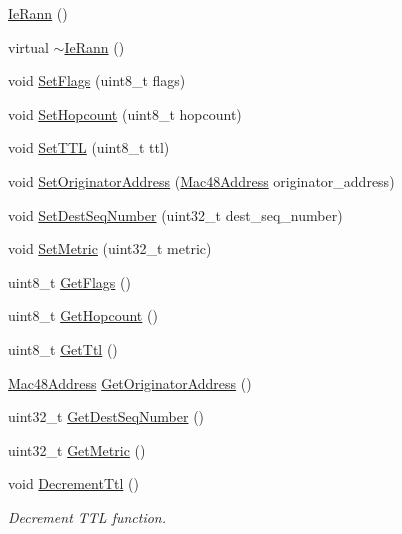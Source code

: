 \begin{DoxyCompactItemize}
\item 
\hyperlink{classns3_1_1dot11s_1_1IeRann_add4a22228ac76a3474c97adfbfef9bd2}{Ie\+Rann} ()
\item 
virtual \hyperlink{classns3_1_1dot11s_1_1IeRann_a70dc00da4bf971bf803baa72fd24ab66}{$\sim$\+Ie\+Rann} ()
\item 
void \hyperlink{classns3_1_1dot11s_1_1IeRann_af3b5bf4a57e30094361078a27d746831}{Set\+Flags} (uint8\+\_\+t flags)
\item 
void \hyperlink{classns3_1_1dot11s_1_1IeRann_aba1d81daa2025c8e12dbb7157bf91c74}{Set\+Hopcount} (uint8\+\_\+t hopcount)
\item 
void \hyperlink{classns3_1_1dot11s_1_1IeRann_a6574c88ee76ab7aac5d3818d1f242ac3}{Set\+T\+TL} (uint8\+\_\+t ttl)
\item 
void \hyperlink{classns3_1_1dot11s_1_1IeRann_acc6bd87dcd2b05d50db2e955ce880d25}{Set\+Originator\+Address} (\hyperlink{classns3_1_1Mac48Address}{Mac48\+Address} originator\+\_\+address)
\item 
void \hyperlink{classns3_1_1dot11s_1_1IeRann_ae4b2a333899cd5ffab78ba602cd96000}{Set\+Dest\+Seq\+Number} (uint32\+\_\+t dest\+\_\+seq\+\_\+number)
\item 
void \hyperlink{classns3_1_1dot11s_1_1IeRann_a069e5d99747574cb524f26fbf4f1eb67}{Set\+Metric} (uint32\+\_\+t metric)
\item 
uint8\+\_\+t \hyperlink{classns3_1_1dot11s_1_1IeRann_a1313537f2f89a35c652ee22fb7206b70}{Get\+Flags} ()
\item 
uint8\+\_\+t \hyperlink{classns3_1_1dot11s_1_1IeRann_ab0ff03e34f780dc4c44a1242be19338e}{Get\+Hopcount} ()
\item 
uint8\+\_\+t \hyperlink{classns3_1_1dot11s_1_1IeRann_a044cd9f053d04a6b40e811a1435c592b}{Get\+Ttl} ()
\item 
\hyperlink{classns3_1_1Mac48Address}{Mac48\+Address} \hyperlink{classns3_1_1dot11s_1_1IeRann_af5f2043ef007c9e5350f9ad61e49392d}{Get\+Originator\+Address} ()
\item 
uint32\+\_\+t \hyperlink{classns3_1_1dot11s_1_1IeRann_aa5a4c1ad34410624696aa4b349b8e277}{Get\+Dest\+Seq\+Number} ()
\item 
uint32\+\_\+t \hyperlink{classns3_1_1dot11s_1_1IeRann_a92829a1f019e1806f1a940cc8ef890bc}{Get\+Metric} ()
\item 
void \hyperlink{classns3_1_1dot11s_1_1IeRann_aab91900df818fee4842b854cb51a386b}{Decrement\+Ttl} ()
\begin{DoxyCompactList}\small\item\em Decrement T\+TL function. \end{DoxyCompactList}\item 

\end{DoxyCompactItemize}
